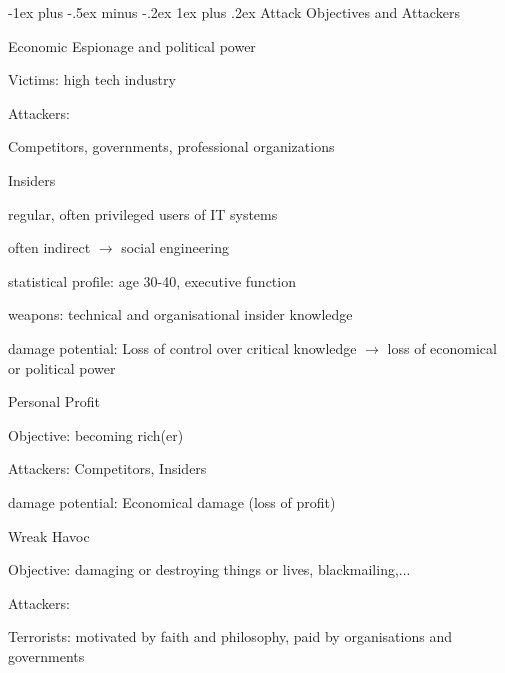 \documentclass[a4paper]{article}
\makeatletter
\renewcommand{\subsubsection}{\@startsection{subsubsection}{3}{0mm}%
                                {-1ex plus -.5ex minus -.2ex}%
                                {1ex plus .2ex}%
                                {\normalfont\small\bfseries}}
\makeatother
\begin{document}
\begin{multicols}{3}
    \subsubsection{Attack Objectives and Attackers}
    \begin{itemize*}
        \item Economic Espionage and political power
        \begin{itemize*}
            \item Victims: high tech industry
            \item Attackers:
            \begin{itemize*}
                \item Competitors, governments, professional organizations
                \item Insiders
                \item regular, often privileged users of IT systems
            \end{itemize*}
            \item often indirect $\rightarrow$ social engineering
            \item statistical profile: age 30-40, executive function
            \item weapons: technical and organisational insider knowledge
            \item damage potential: Loss of control over critical knowledge $\rightarrow$  loss of economical or political power
        \end{itemize*}
        \item Personal Profit
        \begin{itemize*}
            \item Objective: becoming rich(er)
            \item Attackers: Competitors, Insiders
            \item damage potential: Economical damage (loss of profit)
        \end{itemize*}
        \item Wreak Havoc
        \begin{itemize*}
            \item Objective: damaging or destroying things or lives, blackmailing,...
            \item Attackers:
            \begin{itemize*}
                \item Terrorists: motivated by faith and philosophy, paid by organisations and governments

\end{itemize*}
\end{itemize*}
\end{itemize*}
\end{multicols}
\end{document}
